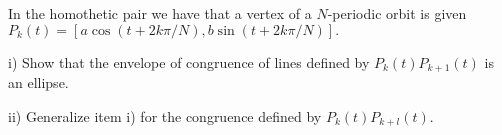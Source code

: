 

\begin{exercise} In the homothetic pair we have that a vertex of a $N$-periodic orbit is given $P_k(t)=[a\cos(t+2 k\pi/N ), b\sin(t+2k\pi/N)].$ 

\noindent i) Show that the envelope of congruence of lines
defined by $P_{k}(t)P_{k+1}(t)$ is an ellipse.

\noindent ii) Generalize item i) for the congruence defined by $P_{k}(t)P_{k+l}(t)$.

\label{exe:appB-01-envelope}
\end{exercise}